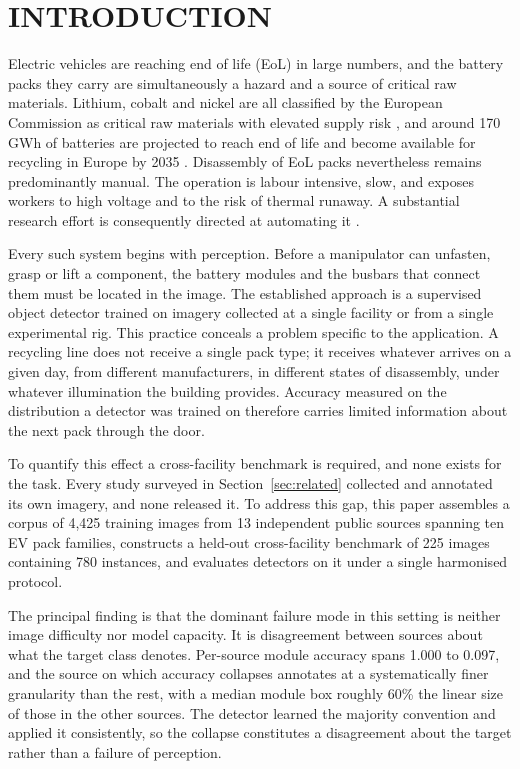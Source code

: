 \section{\uppercase{Introduction}}
\label{sec:intro}

\noindent Electric vehicles are reaching end of life (EoL) in large numbers, and
the battery packs they carry are simultaneously a hazard and a source of critical
raw materials. Lithium, cobalt and nickel are all classified by the European
Commission as critical raw materials with elevated supply risk
\cite{eccrm,harper2019}, and around 170\,GWh of batteries are projected to reach end of
life and become available for recycling in Europe by 2035 \cite{te2024}. Disassembly of EoL packs nevertheless remains predominantly manual. The
operation is labour intensive, slow, and exposes workers to high voltage and to
the risk of thermal runaway. A substantial research effort is consequently
directed at automating it \cite{zang2024robotic,tan2025screws}.

Every such system begins with perception. Before a manipulator can unfasten,
grasp or lift a component, the battery modules and the busbars that connect them
must be located in the image. The established approach is a supervised object
detector trained on imagery collected at a single facility or from a single
experimental rig. This practice conceals a problem specific to the application. A
recycling line does not receive a single pack type; it receives whatever arrives
on a given day, from different manufacturers, in different states of
disassembly, under whatever illumination the building provides. Accuracy
measured on the distribution a detector was trained on therefore carries limited
information about the next pack through the door.

To quantify this effect a cross-facility benchmark is required, and none exists
for the task. Every study surveyed in Section~\ref{sec:related} collected and
annotated its own imagery, and none released it. To address this gap, this paper
assembles a corpus of 4,425 training images from 13 independent public sources
spanning ten EV pack families, constructs a held-out cross-facility benchmark of
225 images containing 780 instances, and evaluates detectors on it under a single
harmonised protocol.

The principal finding is that the dominant failure mode in this setting is
neither image difficulty nor model capacity. It is disagreement between sources
about what the target class denotes. Per-source module accuracy spans
1.000 to 0.097, and the source on which accuracy collapses annotates at a
systematically finer granularity than the rest, with a median module box roughly 60\% the
linear size of those in the other sources. The detector learned the
majority convention and applied it consistently, so the collapse constitutes a
disagreement about the target rather than a failure of perception.

